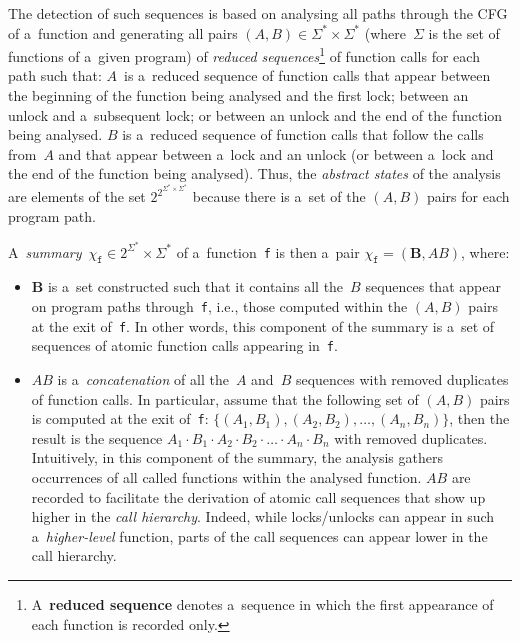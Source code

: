 \documentclass{ExcelAtFIT}
\theoremstyle{example}
\begin{document}
The detection of such sequences is based on analysing all paths through the CFG of a~function and generating all pairs $ {(A, B)} \in {\Sigma^* \times \Sigma^*} $ (where~$ \Sigma $ is the set of functions of a~given program) of \emph{reduced sequences}\footnote{A~\textbf{reduced sequence} denotes a~sequence in which the first appearance of each function is recorded only.} of function calls for each path such that: $ A $~is a~reduced sequence of function calls that appear between the beginning of the function being analysed and the first lock; between an unlock and a~subsequent lock; or between an unlock and the end of the function being analysed. $ B $ is a~reduced sequence of function calls that follow the calls from~$ A $ and that appear between a~lock and an unlock (or between a~lock and the end of the function being analysed). Thus, the \emph{abstract states} of the analysis are elements of the set $ 2^{2^{\Sigma^* \times \Sigma^*}} $ because there is a~set of the ${ (A, B) }$ pairs for each program path.

A~\emph{summary}~$ \chi_\mathtt{f} \in 2^{\Sigma^*} \times \Sigma^* $ of a~function~\texttt{f} is then a~pair $ \chi_\mathtt{f} = (\boldsymbol{B}, AB) $, where:
\begin{itemize}
    \item $ \boldsymbol{B} $ is a~set constructed such that it contains all the~$ B $ sequences that appear on program paths through~\texttt{f}, i.e., those computed within the ${ (A, B) }$ pairs at the exit of~\texttt{f}. In other words, this component of the summary is a~set of sequences of atomic function calls appearing in~\texttt{f}.

    \item $ AB $ is a~\emph{concatenation} of all the~$ A $ and~$ B $ sequences with removed duplicates of function calls. In particular, assume that the following set of ${ (A, B) }$ pairs is computed at the exit of~\texttt{f}: $ \{{(A_1, B_1)}, {(A_2, B_2)}, \ldots, {(A_n, B_n)}\} $, then the result is the sequence $ A_1 \cdot B_1 \cdot A_2 \cdot B_2 \cdot \ldots \cdot A_n \cdot B_n $ with removed duplicates. Intuitively, in this component of the summary, the analysis gathers occurrences of all called functions within the analysed function. $ AB $ are recorded to facilitate the derivation of atomic call sequences that show up higher in the \emph{call hierarchy}. Indeed, while locks/unlocks can appear in such a~\emph{higher-level} function, parts of the call sequences can appear lower in the call hierarchy.
\end{itemize}
\end{document}
